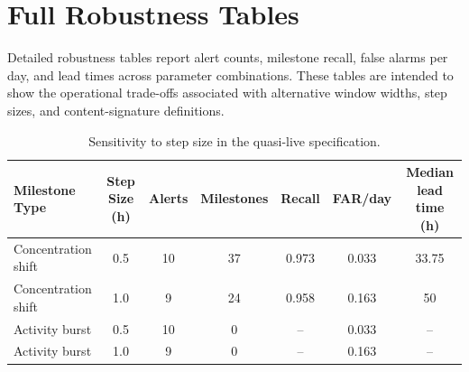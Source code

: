 \documentclass[sigconf]{acmart}
\begin{document}
\section{Full Robustness Tables}
\label{app:robustness}

Detailed robustness tables report alert counts, milestone recall, false alarms per day, and lead times across parameter combinations. These tables are intended to show the operational trade-offs associated with alternative window widths, step sizes, and content-signature definitions.

\begin{table}[h]
\caption{Sensitivity to step size in the quasi-live specification.}
\label{tab:step-sensitivity}
\centering
\scriptsize
\setlength{\tabcolsep}{3pt}
\renewcommand{\arraystretch}{1.05}
\begin{tabular}{l c c c c c c}
\toprule
\textbf{Milestone Type} & \textbf{Step Size (h)} & \textbf{Alerts} & \textbf{Milestones} & \textbf{Recall} & \textbf{FAR/day} & \textbf{Median lead time (h)} \\
\midrule
Concentration shift & 0.5 & 10 & 37 & 0.973 & 0.033 & 33.75 \\
Concentration shift & 1.0 & 9  & 24 & 0.958 & 0.163 & 50 \\
Activity burst      & 0.5 & 10 & 0  & --    & 0.033 & -- \\
Activity burst      & 1.0 & 9  & 0  & --    & 0.163 & -- \\
\bottomrule
\end{tabular}
\end{table}



\end{document}

